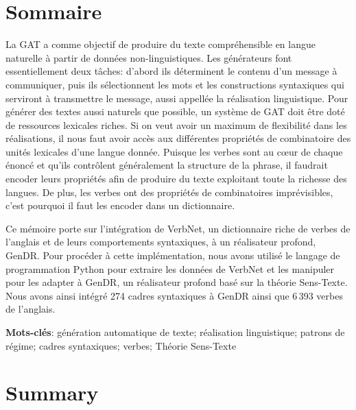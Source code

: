 \chapter*{Sommaire} 	%
La \ac{GAT} a comme objectif de produire du texte compréhensible en langue naturelle à partir de données non-linguistiques. Les générateurs font essentiellement deux tâches: d'abord ils déterminent le contenu d'un message à communiquer, puis ils sélectionnent les mots et les constructions syntaxiques qui serviront à transmettre le message, aussi appellée la réalisation linguistique. Pour générer des textes aussi naturels que possible, un système de \ac{GAT} doit être doté de ressources lexicales riches. Si on veut avoir un maximum de flexibilité dans les réalisations, il nous faut avoir accès aux différentes propriétés de combinatoire des unités lexicales d'une langue donnée. Puisque les verbes sont au c\oe{}ur de chaque énoncé et qu'ils contrôlent généralement la structure de la phrase, il faudrait encoder leurs propriétés afin de produire du texte exploitant toute la richesse des langues. De plus, les verbes ont des propriétés de combinatoires imprévisibles, c'est pourquoi il faut les encoder dans un dictionnaire.

Ce mémoire porte sur l'intégration de VerbNet, un dictionnaire riche de verbes de l'anglais et de leurs comportements syntaxiques, à un réalisateur profond, GenDR. Pour procéder à cette implémentation, nous avons utilisé le langage de programmation Python pour extraire les données de VerbNet et les manipuler pour les adapter à GenDR, un réalisateur profond basé sur la théorie Sens-Texte. Nous avons ainsi intégré 274 cadres syntaxiques à GenDR ainsi que 6\,393 verbes de l'anglais.

\textbf{Mots-clés}: génération automatique de texte; réalisation linguistique; patrons de régime; cadres syntaxiques; verbes; Théorie Sens-Texte

\chapter*{Summary}

